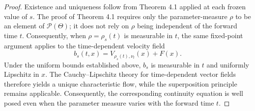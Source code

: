 \documentclass[11pt,a4wide]{article}
\theoremstyle{definition}
\newcommand{\Prob}{\mathcal{P}}
\newcommand{\Wass}{\mathcal{W}}
\begin{document}
\begin{proof}

Existence and uniqueness follow from Theorem 4.1 applied at each frozen value of $s$. The proof of
Theorem 4.1 requires only  the parameter-measure $\rho$ to be an  element of
$\mathcal P(\Theta)$; it does not rely on $\rho$ being independent of the forward time $t$. 
Consequently, when $\rho=\rho_s(t)$ is measurable in $t$, the same fixed-point argument applies to the
time-dependent velocity field
\[
b_s(t, x)=V_{\rho_s(t),\nu_t}(x) + F(x). 
\]
Under the uniform bounds established above, $b_s$  is measurable in $t$ and uniformly Lipschitz in $x$. The Cauchy–Lipschitz theory for time-dependent vector fields therefore yields a unique characteristic flow, while the superposition principle remains applicable. Consequently, the corresponding continuity equation is well posed even when the parameter measure varies with the forward time $t$.


\end{proof}
\end{document}
